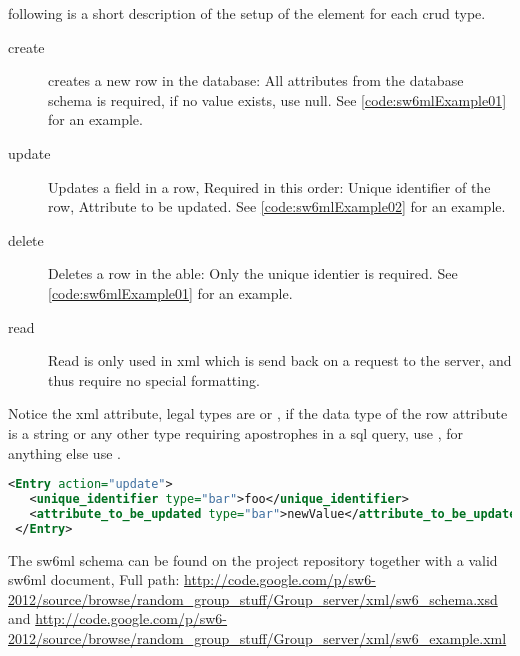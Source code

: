 following is a short description of the setup of the  element for each crud type.

\begin{description}
 \item[create] creates a new row in the database: All attributes from the database schema is required, if no value exists, use null. See \autoref{code:sw6mlExample01} for an example.
 \item[update] Updates a field in a row, Required in this order: Unique identifier of the row, Attribute to be updated. See \autoref{code:sw6mlExample02} for an example.
 \item[delete] Deletes a row in the able: Only the unique identier is required. See \autoref{code:sw6mlExample01} for an example.
 \item[read]   Read is only used in xml which is send back on a request to the server, and thus require no special formatting.
\end{description}

Notice the  xml attribute, legal types are  or , if the data type of the row attribute is a string or any other type requiring apostrophes
in a sql query, use , for anything else use .

\begin{Code}
\begin{lstlisting}[label=code:sw6mlExample02,language=XML,caption="sw6ml Update syntax example]
 <Entry action="update">
   <unique_identifier type="bar">foo</unique_identifier>
   <attribute_to_be_updated type="bar">newValue</attribute_to_be_updated>
 </Entry>
\end{lstlisting}
\end{Code}

The sw6ml schema can be found on the project repository together with a valid sw6ml document,
Full path: \url{http://code.google.com/p/sw6-2012/source/browse/random_group_stuff/Group_server/xml/sw6_schema.xsd}
and \url{http://code.google.com/p/sw6-2012/source/browse/random_group_stuff/Group_server/xml/sw6_example.xml} %

